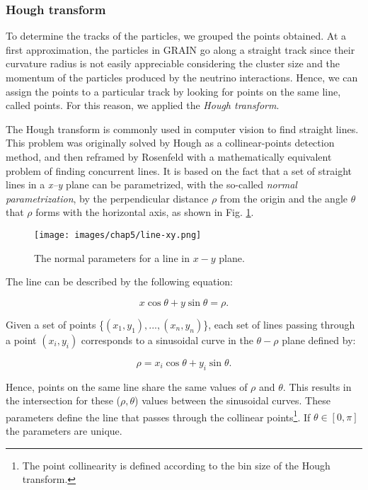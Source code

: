 \subsubsection{Hough transform}
To determine the tracks of the particles, we grouped the \lpc points obtained. At a first approximation, the particles in GRAIN go along a straight track since their curvature radius is not easily appreciable considering the cluster size and the momentum of the particles produced by the neutrino interactions. Hence, we can assign the \lpc points to a particular track by looking for points on the same line, called  points. For this reason, we applied the \textit{Hough transform}.

The Hough transform \cite{Hough-transf} is commonly used in computer vision to find straight lines. This problem was originally solved by Hough \cite{hough-patent} as a collinear-points detection method, and then reframed by Rosenfeld \cite{Rosenfeld-hough-transf} with a mathematically equivalent problem of finding concurrent lines. It is based on the fact that a set of straight lines in a \textit{x--y} plane can be parametrized, with the so-called \textit{normal parametrization}, by the perpendicular distance $\rho$ from the origin and the angle $\theta$ that $\rho$ forms with the horizontal axis, as shown in Fig. \ref{fig:line-xy}.

\begin{figure}[h!]
    \centering
    \texttt{[image: images/chap5/line-xy.png]}
    \caption{The normal parameters for a line in $x-y$ plane. \cite{Hough-transf}}
    \label{fig:line-xy}
\end{figure}
The line can be described by the following equation: 

\begin{equation}
    x \cos{\theta} + y \sin{\theta} = \rho.
\end{equation}

Given a set of points \{$(x_1,y_1), ..., (x_n, y_n)$\}, each set of lines passing through a point $(x_i, y_i)$ corresponds to a sinusoidal curve in the $\theta - \rho$ plane defined by: 

\begin{equation}
    \rho = x_i \cos{\theta} + y_i \sin{\theta}.
\end{equation}

Hence, points on the same line share the same values of $\rho$ and $\theta$. This results in the intersection for these ($\rho, \theta$) values between the sinusoidal curves. These parameters define the line that passes through the collinear points\footnote{The point collinearity is defined according to the bin size of the Hough transform.}. If $\theta \in [0,\pi]$ the parameters are unique. 

